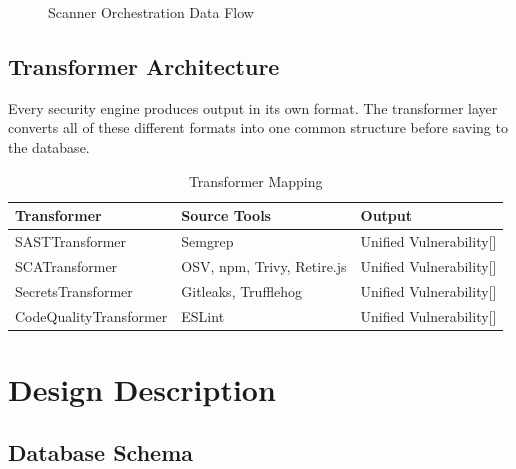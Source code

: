 \documentclass[12pt,a4paper]{report}
\begin{document}
\begin{figure}[H]
\caption{Scanner Orchestration Data Flow}
\label{fig:scanner_flow}
\end{figure}
\clearpage
\subsection{Transformer Architecture}

Every security engine produces output in its own format. The transformer layer converts all of these different formats into one common structure before saving to the database.

\begin{table}[H]
\centering
\caption{Transformer Mapping}
\label{tab:transformers}
\begin{tabular}{|l|l|l|}
\hline
\textbf{Transformer} & \textbf{Source Tools} & \textbf{Output} \\
\hline
SASTTransformer & Semgrep & Unified Vulnerability{[}{]} \\
\hline
SCATransformer & OSV, npm, Trivy, Retire.js & Unified Vulnerability{[}{]} \\
\hline
SecretsTransformer & Gitleaks, Trufflehog & Unified Vulnerability{[}{]} \\
\hline
CodeQualityTransformer & ESLint & Unified Vulnerability{[}{]} \\
\hline
\end{tabular}
\end{table}

\section{Design Description}

\subsection{Database Schema}
\end{document}
